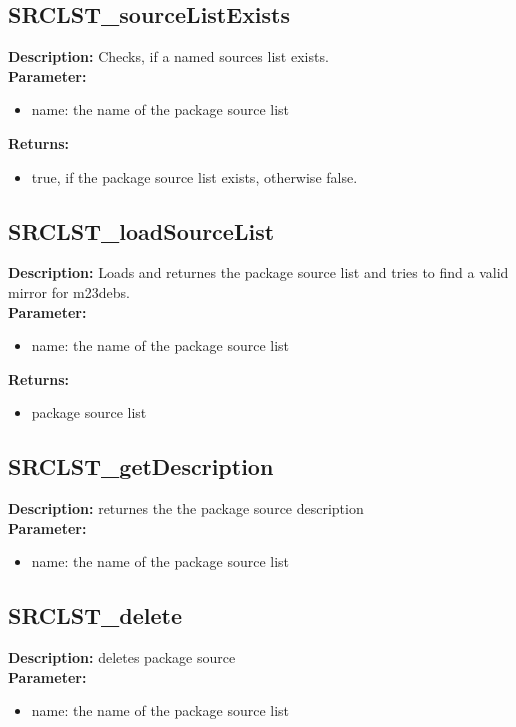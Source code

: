 \subsection{SRCLST\_sourceListExists}
\textbf{Description:} Checks, if a named sources list exists.\\
\textbf{Parameter:}
\begin{itemize}
\item name: the name of the package source list
\end{itemize}
\textbf{Returns:}
\begin{itemize}
\item true, if the package source list exists, otherwise false.
\end{itemize}

\subsection{SRCLST\_loadSourceList}
\textbf{Description:} Loads and returnes the package source list and tries to find a valid mirror for m23debs.\\
\textbf{Parameter:}
\begin{itemize}
\item name: the name of the package source list
\end{itemize}
\textbf{Returns:}
\begin{itemize}
\item package source list
\end{itemize}

\subsection{SRCLST\_getDescription}
\textbf{Description:} returnes the the package source description\\
\textbf{Parameter:}
\begin{itemize}
\item name: the name of the package source list
\end{itemize}

\subsection{SRCLST\_delete}
\textbf{Description:} deletes package source\\
\textbf{Parameter:}
\begin{itemize}
\item name: the name of the package source list
\end{itemize}

